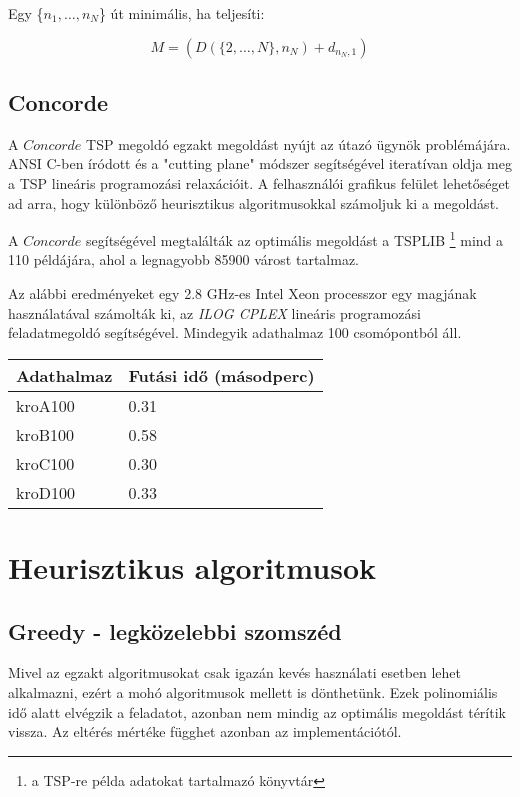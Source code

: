 Egy \{\(n_1, \dots, n_N\)\} út minimális, ha teljesíti:

\begin{equation}
M = (D(\{2, \dots, N\}, n_N)+d_{n_N, 1})
\end{equation}

\subsection{Concorde}

A \(Concorde\) TSP megoldó \cite{3} egzakt megoldást nyújt az útazó ügynök problémájára. ANSI C-ben íródott és a "cutting plane" módszer segítségével iteratívan oldja meg a TSP lineáris programozási relaxációit. A felhasználói grafikus felület lehetőséget ad arra, hogy különböző heurisztikus algoritmusokkal számoljuk ki a megoldást. 

A \(Concorde\) segítségével megtalálták az optimális megoldást a TSPLIB%
\footnote{ %
	a TSP-re példa adatokat tartalmazó könyvtár
}  %
 \cite{8} mind a 110 példájára, ahol a legnagyobb 85900 várost tartalmaz.

Az alábbi eredményeket egy 2.8 GHz-es Intel Xeon processzor egy magjának használatával számolták ki, az \textit{ILOG CPLEX} lineáris programozási feladatmegoldó segítségével. Mindegyik adathalmaz 100 csomópontból áll.

\begin{table}[]
	\begin{tabular}{l|l}
		\textbf{Adathalmaz} & \textbf{Futási idő} (másodperc) \\
		\hline
		kroA100         & 0.31  \\
		kroB100         & 0.58 \\
		kroC100         & 0.30 \\   
		kroD100         & 0.33        
	\end{tabular}
\end{table}

\section{Heurisztikus algoritmusok}\label{sec:ALAP:adatelem}

\subsection{Greedy - legközelebbi szomszéd}

Mivel az egzakt algoritmusokat csak igazán kevés használati esetben lehet alkalmazni, ezért a mohó algoritmusok mellett is dönthetünk. Ezek polinomiális idő alatt elvégzik a feladatot, azonban nem mindig az optimális megoldást térítik vissza. Az eltérés mértéke függhet azonban az implementációtól.


